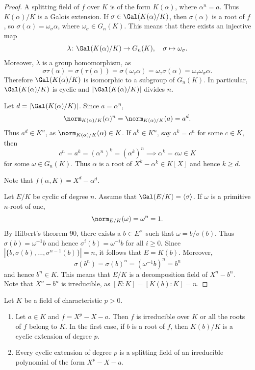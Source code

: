 \begin{proof}
    A splitting field of $f$ over $K$ is
    of the form $K(\alpha)$, where $\alpha^n=a$. Thus 
    $K(\alpha)/K$ is a Galois extension. If $\sigma\in\Gal(K(\alpha)/K)$, 
    then $\sigma(\alpha)$ is a root of $f$, so 
    $\sigma(\alpha)=\omega_\sigma\alpha$, where
    $\omega_\sigma\in G_n(K)$. This means that 
    there exists an injective map
    \[
    \lambda\colon\Gal(K(\alpha)/K)\to G_n(K),
    \quad
    \sigma\mapsto\omega_{\sigma}.
    \]
    Moreover, $\lambda$ is a group homomorphism, as 
    \[
    \sigma\tau(\alpha)=\sigma(\tau(\alpha))=\sigma(\omega_{\tau}\alpha)=\omega_\tau\sigma(\alpha)=\omega_{\tau}\omega_{\sigma}\alpha.
    \]
    Therefore $\Gal(K(\alpha)/K)$ is isomorphic to a subgroup
    of $G_n(K)$. In particular, $\Gal(K(\alpha)/K)$ is cyclic
    and $|\Gal(K(\alpha)/K)|$ divides $n$.
    
    
    Let $d=|\Gal(K(\alpha)/K)|$. Since $a=\alpha^n$, 
    \[
    \norm_{K(\alpha)/K}(\alpha)^n=\norm_{K(\alpha)/K}(a)=a^d.
    \]
    Thus $a^d\in K^n$, as $\norm_{K(\alpha)/K}(\alpha)\in K$. If $a^k\in K^n$, 
    say $a^k=c^n$ for some $c\in K$, then 
    \[
    c^n=a^k=(\alpha^n)^k=(\alpha^k)^n
    \implies 
    \alpha^k=c\omega\in K
    \]
    for some $\omega\in G_n(K)$. Thus $\alpha$ is a root of $X^k-\alpha^k\in K[X]$
    and hence $k\geq d$. 
    
    Note that $f(\alpha,K)=X^d-\alpha^d$. 
    
    Let $E/K$ be cyclic of degree $n$. Assume that  
    $\Gal(E/K)=\langle\sigma\rangle$.
    If $\omega$ is a primitive
    $n$-root of one, 
    \[
    \norm_{E/K}(\omega)=\omega^n=1.
    \]
    By Hilbert's theorem 90, 
    there exists a $b\in E^{\times}$ such that 
    $\omega=b/\sigma(b)$. Thus
    $\sigma(b)=\omega^{-1} b$ and hence 
    $\sigma^i(b)=\omega^{-i} b$ for all $i\geq0$. Since 
    $|\{b,\sigma(b),\dots,\sigma^{n-1}(b)\}|=n$, 
    it follows that $E=K(b)$. Moreover, 
    \[
    \sigma(b^n)=\sigma(b)^n=(\omega^{-1} b)^n=b^n
    \]
    and hence $b^n\in K$. This means that $E/K$ is a decomposition
    field of $X^n-b^n$. Note that $X^n-b^n$ is irreducible, as 
    $[E:K]=[K(b):K]=n$. 
\end{proof}

\begin{proposition}
    Let $K$ be a field of characteristic $p>0$. 
    \begin{enumerate}
        \item Let $a\in K$ and $f=X^p-X-a$. Then 
        $f$ is irreducible over $K$ or all the roots of 
        $f$ belong to $K$. 
        In the first case, if $b$ is a root of $f$, then 
        $K(b)/K$ is a cyclic extension of degree $p$. 
        \item Every cyclic extension of degree $p$ 
        is a splitting field of an irreducible
        polynomial of the form $X^p-X-a$. 
    \end{enumerate}
\end{proposition}

